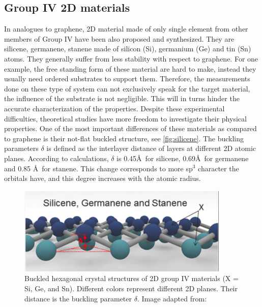 \subsection{Group IV 2D materials}

In analogues to graphene, 2D material made of only single element from other members of Group IV have been also proposed and synthesized. They are silicene, germanene, stanene made of silicon (Si), germanium (Ge) and tin (Sn) atoms. They generally suffer from less stability with respect to graphene. For one example, the free standing form of these material are hard to make, instead they usually need ordered substrates to support them. Therefore, the measurements done on these type of system can not exclusively speak for the target material, the influence of the substrate is not negligible\cite{Lin2013,}. This will in turns hinder the accurate characterization of the properties. Despite these experimental difficulties, theoretical studies have more freedom to investigate their physical properties. One of the most important differences of these materials as compared to graphene is their not-flat buckled structure, see \autoref{fig:silicene}. The buckling parameters $\delta$ is defined as the interlayer distance of layers at different 2D atomic planes. According to calculations, $\delta$ is 0.45\AA~for silicene, 0.69\AA~for germanene and 0.85 \AA~for stanene\cite{matthes2013}. This change corresponds to more sp$^3$ character the orbitals have, and this degree increases with the atomic radius. 

\begin{figure}[htbp!] 
\centering  
\includegraphics[width=0.9\textwidth]{silicene_structure.png}
\caption{Buckled hexagonal crystal structures of 2D group IV materials (X = Si, Ge, and Sn). Different colors represent different 2D planes. Their distance is the buckling parameter $\delta$. Image adapted from:\cite{Balendhran2015}}  
\label{fig:silicene}
\end{figure} 


